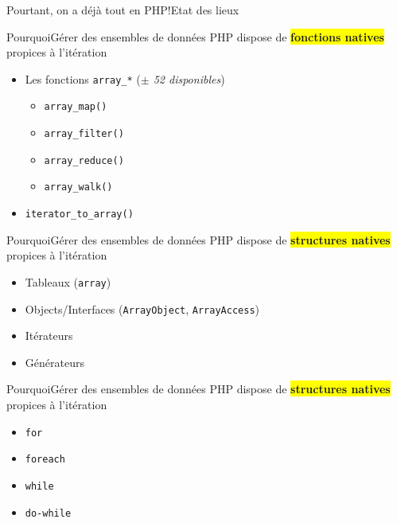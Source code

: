 \begin{frameC}{Pourtant, on a déjà tout en PHP!}{Etat des lieux}

\end{frameC}

\begin{frame}{Pourquoi}{Gérer des ensembles de données}
    PHP dispose de \colorbox{yellow}{\textbf{fonctions natives}} propices à l'itération

    \pause

    \begin{itemize}[<+->]
        \item Les fonctions \texttt{array\_*} (\textit{$\pm$ 52 disponibles})
        \begin{itemize}[<+->]
            \item \texttt{array\_map()}
            \item \texttt{array\_filter()}
            \item \texttt{array\_reduce()}
            \item \texttt{array\_walk()}
        \end{itemize}
    \item \texttt{iterator\_to\_array()}
    \end{itemize}
\end{frame}

\begin{frame}{Pourquoi}{Gérer des ensembles de données}
    PHP dispose de \colorbox{yellow}{\textbf{structures natives}} propices à l'itération

    \pause

    \begin{itemize}[<+->]
        \item Tableaux (\texttt{array})
        \item Objects/Interfaces (\texttt{ArrayObject}, \texttt{ArrayAccess})
        \item Itérateurs
        \item Générateurs
    \end{itemize}
\end{frame}

\begin{frame}{Pourquoi}{Gérer des ensembles de données}
    PHP dispose de \colorbox{yellow}{\textbf{structures natives}} propices à l'itération

    \pause

    \begin{itemize}[<+->]
        \item \texttt{for}
        \item \texttt{foreach}
        \item \texttt{while}
        \item \texttt{do-while}
    \end{itemize}
\end{frame}

